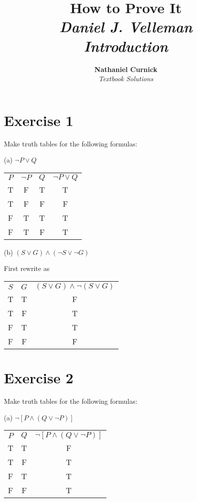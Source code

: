 \documentclass[11pt]{article}
\title{\textbf{How to Prove It} \\ {\Large\itshape Daniel J. Velleman} \\ {\Large\itshape Introduction}}
\author{\textbf{Nathaniel Curnick} \\ \textit{Textbook Solutions}}
\date{}
\begin{document}
\maketitle

\section*{Exercise 1}

Make truth tables for the following formulas:

\noindent (a) $ \neg P \vee Q $

\begin{center}
\begin{tabular}{ c c c c }
 $P$ & $\neg P$ & $Q$ & $ \neg P \vee Q $ \\ 
T & F & T & T\\  
T & F & F & F\\
F & T & T & T\\  
F & T & F & T
\end{tabular}
\end{center}

\noindent (b) $ (S \vee G) \wedge (\neg S \vee \neg G) $

First rewrite as 

\begin{center}
\begin{tabular}{ c c c  }
 $S$ & $G$ & $ (S \vee G) \wedge \neg (S \vee G) $\\ 
T & T & F\\  
T & F & T\\
F & T & T\\  
F & F & F
\end{tabular}
\end{center}

\section*{Exercise 2}
Make truth tables for the following formulas:

\noindent (a) $ \neg [P \wedge (Q \vee \neg P)] $

\begin{center}
\begin{tabular}{ c c c  }
 $P$ & $Q$ & $ \neg [P \wedge (Q \vee \neg P)] $\\ 
T & T & F\\  
T & F & T\\
F & T & T\\  
F & F & T
\end{tabular}
\end{center}
\end{document}
